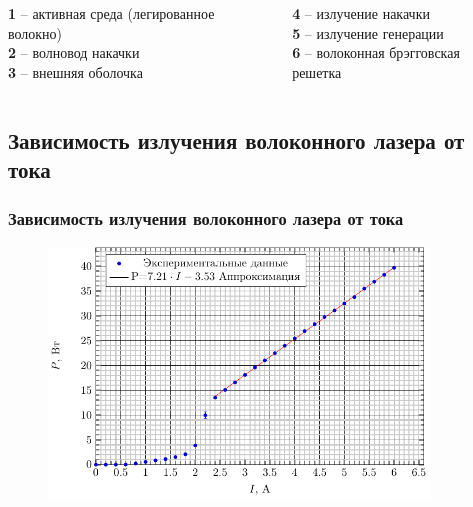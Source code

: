 \documentclass[10pt,pdf,hyperref={unicode}, dvipsnames]{beamer}
\newcommand\frametitless[1]{\subsection{#1}\frametitle{#1}}
\begin{document}
\begin{frame}[t]
		\vspace{1cm}
	\begin{columns}
		\begin{column}{0.4\textwidth}
			\textbf{1} -- активная среда (легированное волокно)\\ 
			\textbf{2} -- волновод накачки\\
			\textbf{3} -- внешняя оболочка
		\end{column}
		\begin{column}{0.4\textwidth}
			\textbf{4} -- излучение накачки\\
			\textbf{5} -- излучение генерации\\
			\textbf{6} -- волоконная брэгговская решетка%
		\end{column}
	\end{columns}
\end{frame}
\begin{frame}[t]
	\frametitless{Зависимость излучения волоконного лазера от тока}
		\begin{figure}[tb]
		\centering
		\includegraphics[width=0.9\textwidth]{img/PI}
	\end{figure}
\end{frame}
\end{document}
